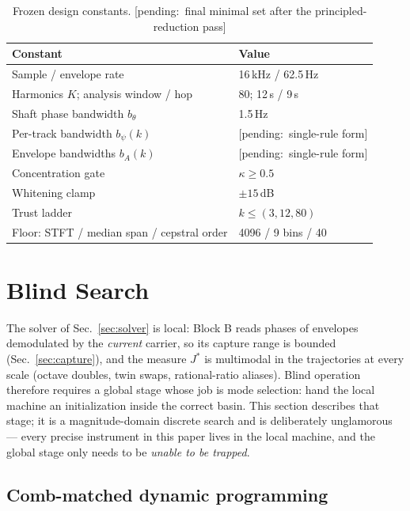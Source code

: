 \documentclass[journal]{IEEEtran}
\newcommand{\Jobj}{\ensuremath{J}}
\newcommand{\pending}[1]{{\color{gray}\textsf{[pending:~#1]}}}
\begin{document}
\begin{table}[t]
  \centering
  \caption{Frozen design constants. \pending{final minimal set after the
      principled-reduction pass}}
  \label{tab:constants}
  \scriptsize
  \setlength{\tabcolsep}{4pt}
  \begin{tabular}{@{}ll@{}}
    \toprule
    Constant & Value \\
    \midrule
    Sample / envelope rate & 16\,kHz / 62.5\,Hz \\
    Harmonics $K$; analysis window / hop & 80; 12\,s / 9\,s \\
    Shaft phase bandwidth $b_\theta$ & 1.5\,Hz \\
    Per-track bandwidth $b_\psi(k)$ & \pending{single-rule form} \\
    Envelope bandwidths $b_A(k)$ & \pending{single-rule form} \\
    Concentration gate & $\kappa \ge 0.5$ \\
    Whitening clamp & $\pm 15$\,dB \\
    Trust ladder & $k \le (3, 12, 80)$ \\
    Floor: STFT / median span / cepstral order &
      4096 / 9 bins / 40 \\
    \bottomrule
  \end{tabular}
\end{table}

\section{Blind Search}
\label{sec:search}

The solver of Sec.~\ref{sec:solver} is local: Block B reads phases of
envelopes demodulated by the \emph{current} carrier, so its capture
range is bounded (Sec.~\ref{sec:capture}), and the measure
$\Jobj^\ast$ is multimodal in the trajectories at every scale (octave
doubles, twin swaps, rational-ratio aliases). Blind operation therefore
requires a global stage whose job is mode selection: hand the local
machine an initialization inside the correct basin. This section
describes that stage; it is a magnitude-domain discrete search and is
deliberately unglamorous --- every precise instrument in this paper
lives in the local machine, and the global stage only needs to be
\emph{unable to be trapped}.

\subsection{Comb-matched dynamic programming}
\label{sec:global}
\end{document}
